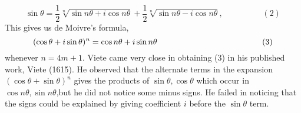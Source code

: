 \documentclass[a4paper,reqno,11pt]{amsart}
\theoremstyle{plain}%
\theoremstyle{definition}
\theoremstyle{remark}
\begin{document}
$$\sin \theta = \frac{1}{2}\sqrt[n]{\sin n\theta + i\cos n\theta} + \frac{1}{2}\sqrt[n]{\sin n\theta - i\cos n\theta}, \hspace{2cm} (2) $$
This gives us de Moivre’s formula,\\
$$(\cos\theta + i\sin\theta)^n = \cos n\theta + i\sin n\theta \hspace{4.5cm} (3)$$
whenever $n = 4m+1.$ Viete came very close in obtaining (3) in his published work, Viete (1615). He observed that the alternate terms in the expansion
$(\cos \theta + \sin \theta)^n$ gives the products of $\sin \theta, \cos \theta$ which occur in $\cos n\theta, \sin n\theta$,but he did not notice some minus signs. He failed in noticing that the signs could be explained by giving coefficient $i$ before the $\sin \theta$ term.\\
\\
\end{document}
